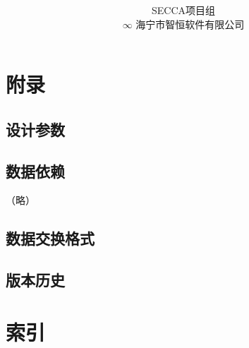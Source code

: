 \documentclass[hyperref, oneside]{book}
\title {\modtitle \\ \modsubtitle}
\author{SECCA项目组 \\ $\infty$ \small{海宁市智恒软件有限公司}}
\makeatletter
\newcommand\Fyes{$\bigcirc$}
\newcommand\Fno{$\times$}
\newcommand\makefeaturetable{
    \begin{table} \caption{数据特性} \centering
    \pgfplotstabletypeset[
        alias/访问控制/.initial=2,
        alias/缓存/.initial=5,
        alias/审核支持/.initial=5,
        alias/会计对象/.initial=5,
        alias/工资采集/.initial=5,
        columns={ 0, 1, 2, 3, 访问控制, 缓存, 4, 审核支持, 会计对象, 工资采集 },
        columns/0/.style={ column name={}, column type=r|, string type },
        columns/1/.style={ column name={对象}, string type },
        columns/2/.style={ column name={类型}, string type,
                string replace={E}{关系},
                string replace={C}{系统},
                string replace={Dict}{目录},
                string replace={UI}{实体},
                string replace={Tree}{结点},
                string replace={Process}{过程},
                string replace={MomentInterval}{记录},
                string replace={Ext}{高级},
                },
        columns/3/.style={ column name={设计规模}, column type=r, std=0:6 },
        columns/4/.style={ column name={预置数据}, string type,
            preproc cell content/.code={
                \pgfkeyssetvalue{/pgfplots/table/@cell content}{
                    ###1
                }}},
        columns/访问控制/.style={ string type,
            preproc cell content/.code={
                \pgfkeyssetvalue{/pgfplots/table/@cell content}{
                    \IfStrEqCase{###1}{
                        {E}{\Fno}
                        {Pool}{\Fno}}[\Fyes]
                }}},
        columns/缓存/.style={ string type,
            preproc cell content/.code={
                \pgfkeyssetvalue{/pgfplots/table/@cell content}{
                    \IfSubStr{###1}{C}{\Fyes}{\Fno}
                }}},
        columns/审核支持/.style={ string type,
            preproc cell content/.code={
                \pgfkeyssetvalue{/pgfplots/table/@cell content}{
                    \IfSubStr{###1}{V}{\Fyes}{\Fno}
                }}},
        columns/会计对象/.style={ string type,
            preproc cell content/.code={
                \pgfkeyssetvalue{/pgfplots/table/@cell content}{
                    \IfSubStr{###1}{A}{\Fyes}{\Fno}
                }}},
        columns/工资采集/.style={ string type,
            preproc cell content/.code={
                \pgfkeyssetvalue{/pgfplots/table/@cell content}{
                    \IfSubStr{###1}{S}{\Fyes}{\Fno}
                }}},
        every head row/.style={ before row=\toprule, after row=\midrule },
        every last row/.style={ after row=\bottomrule },
        col sep=comma, header=false
        ]{matrix.csv}
    \end{table}
}
\makeatother
\begin{document}
\renewcommand*\sectionmark[1]{\markright{\thesection. #1}}
\renewcommand*\thesection{\arabic{section}}

\maketitle

\renewcommand\contentsname{目录/Contents}
\tableofcontents
\clearpage



\section{附录}

    \subsection{设计参数}
        \begin{landscape}
            \makefeaturetable
        \end{landscape}

    \subsection{数据依赖}
    （略）

    \subsection{数据交换格式}

    \subsection{版本历史}

\section{索引}

    \listoftables
    \listoffigures
\end{document}
